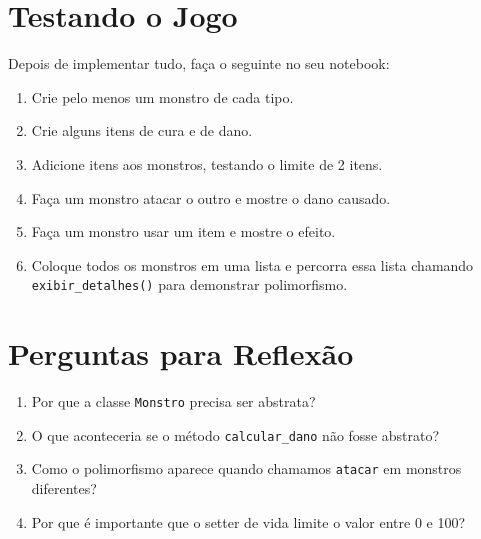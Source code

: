 \documentclass{article}
\begin{document}
\section{Testando o Jogo}

Depois de implementar tudo, faça o seguinte no seu notebook:

\begin{enumerate}
    \item Crie pelo menos um monstro de cada tipo.
    \item Crie alguns itens de cura e de dano.
    \item Adicione itens aos monstros, testando o limite de 2 itens.
    \item Faça um monstro atacar o outro e mostre o dano causado.
    \item Faça um monstro usar um item e mostre o efeito.
    \item Coloque todos os monstros em uma lista e percorra essa lista chamando
          \texttt{exibir\_detalhes()} para demonstrar polimorfismo.
\end{enumerate}

\section{Perguntas para Reflexão}

\begin{enumerate}
    \item Por que a classe \texttt{Monstro} precisa ser abstrata?
    \item O que aconteceria se o método \texttt{calcular\_dano} não fosse abstrato?
    \item Como o polimorfismo aparece quando chamamos \texttt{atacar} em monstros diferentes?
    \item Por que é importante que o setter de vida limite o valor entre 0 e 100?
\end{enumerate}
\end{document}
